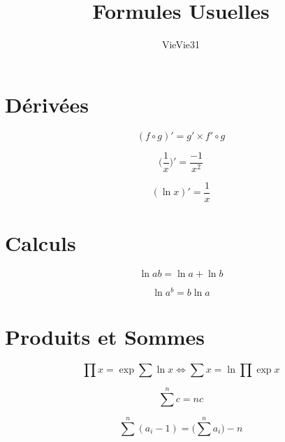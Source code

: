 \documentclass{article}
\title{Formules Usuelles}
\author{VieVie31}
\begin{document}
\newtheorem{theo}{Théorème}
\newtheorem{coro}{Corollaire}

\maketitle

\section{Dérivées}

\begin{equation}
    (f \circ g)' = g' \times f' \circ g
\end{equation}

\begin{equation}
    \Big( \frac{1}{x} \Big)' = \frac{-1}{x^2} 
\end{equation}

\begin{equation}
    (\ln x)' = \frac{1}{x}
\end{equation}



\section{Calculs}

\begin{equation}
    \ln ab = \ln a + \ln b    
\end{equation}

\begin{equation}
    \ln a^b = b \ln a
\end{equation}



\section{Produits et Sommes}

\begin{equation}
    \prod x = \exp \sum \ln x
    \iff \sum x = \ln \prod \exp x
\end{equation}

\begin{equation}
    \sum \limits^n c = nc
\end{equation}

\begin{equation}
    \sum \limits^n (a_i - 1) = \Big( \sum \limits^n a_i \Big) -n
\end{equation}
\end{document}
